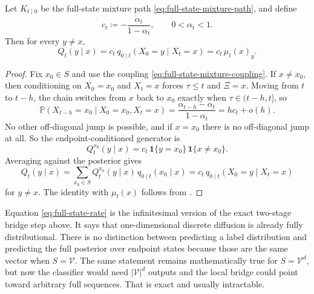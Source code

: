 \documentclass[11pt]{article}
\begin{document}
\begin{proposition}
\label{prop:full-state-rates}
Let \(K_{t\mid 0}\) be the full-state mixture path \eqref{eq:full-state-mixture-path}, and define
\[
  c_t\coloneqq -\frac{\dot\alpha_t}{1-\alpha_t},
  \qquad 0<\alpha_t<1.
\]
Then for every \(y\neq x\),
\begin{equation}
  Q_t(y\mid x)
  =
  c_t\,q_{0\mid t}(X_0=y\mid X_t=x)
  =
  c_t\,\mu_t(x)_y.
  \label{eq:full-state-rate}
\end{equation}
\end{proposition}
\begin{proof}
Fix \(x_0\in S\) and use the coupling \eqref{eq:full-state-mixture-coupling}.
If \(x\neq x_0\), then conditioning on \(X_0=x_0\) and \(X_t=x\) forces \(\tau\le t\) and \(\Xi=x\).
Moving from \(t\) to \(t-h\), the chain switches from \(x\) back to \(x_0\) exactly when \(\tau\in(t-h,t]\), so
\[
  \mathbb{P}(X_{t-h}=x_0\mid X_0=x_0,X_t=x)
  =
  \frac{\alpha_{t-h}-\alpha_t}{1-\alpha_t}
  =
  hc_t+o(h).
\]
No other off-diagonal jump is possible, and if \(x=x_0\) there is no off-diagonal jump at all.
So the endpoint-conditioned generator is
\[
  Q_t^{x_0}(y\mid x)
  =
  c_t\,\mathbf{1}\{y=x_0\}\,\mathbf{1}\{x\neq x_0\}.
\]
Averaging against the posterior gives
\[
  Q_t(y\mid x)
  =
  \sum_{x_0\in S} Q_t^{x_0}(y\mid x)\,q_{0\mid t}(x_0\mid x)
  =
  c_t\,q_{0\mid t}(X_0=y\mid X_t=x)
\]
for \(y\neq x\).
The identity with \(\mu_t(x)\) follows from .%
\end{proof}

Equation \eqref{eq:full-state-rate} is the infinitesimal version of the exact two-stage bridge step above.
It says that one-dimensional discrete diffusion is already fully distributional.
There is no distinction between predicting a label distribution and predicting the full posterior over endpoint states because those are the same vector when \(S=\mathcal{V}\).
The same statement remains mathematically true for \(S=\mathcal{V}^d\), but now the classifier would need \(|\mathcal{V}|^d\) outputs and the local bridge could point toward arbitrary full sequences.
That is exact and usually intractable.
\end{document}
